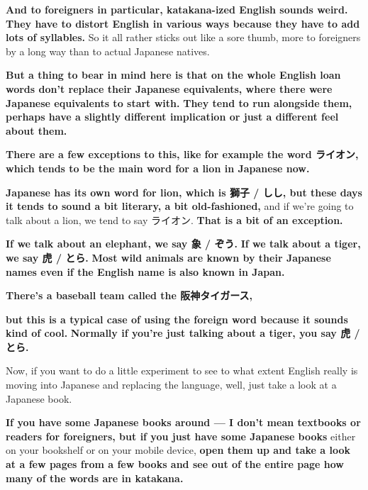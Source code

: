 {\bf And to foreigners in particular, katakana-ized English sounds weird.} {\bf They have to distort English in various ways because they have to add lots of syllables.} So it all rather sticks out like a sore thumb, more to foreigners by a long way than to actual Japanese natives.

\thinrule

{\bf But a thing to bear in mind here is that on the whole English loan words don't replace their Japanese equivalents, where there were Japanese equivalents to start with.} {\bf They tend to run alongside them, perhaps have a slightly different implication or just a different feel about them.}

\thinrule

{\bf There are a few exceptions to this, like for example the word ライオン, which tends to be the main word for a lion in Japanese now.}

{}

{\bf Japanese has its own word for lion, which is 獅子 / しし, but these days it tends to sound a bit literary, a bit old-fashioned,} and if we're going to talk about a lion, we tend to say ライオン. {\bf That is a bit of an exception.}

{\bf If we talk about an elephant, we say 象 / ぞう.} {\bf If we talk about a tiger, we say 虎 / とら.} {\bf Most wild animals are known by their Japanese names even if the English name is also known in Japan.}

{\bf There's a baseball team called the 阪神タイガース,}

{}

{\bf but this is a typical case of using the foreign word because it sounds kind of cool.} {\bf Normally if you're just talking about a tiger, you say 虎 / とら.}

\stopsectionlevel

\startsectionlevel[title={To what extent is English really moving into Japanese?},reference={to-what-extent-is-english-really-moving-into-japanese}]

Now, if you want to do a little experiment to see to what extent English really is moving into Japanese and replacing the language, well, just take a look at a Japanese book.

{\bf If you have some Japanese books around --- I don't mean textbooks or readers for foreigners, but if you just have some Japanese books} either on your bookshelf or on your mobile device, {\bf open them up and take a look at a few pages from a few books and see out of the entire page how many of the words are in katakana.}


